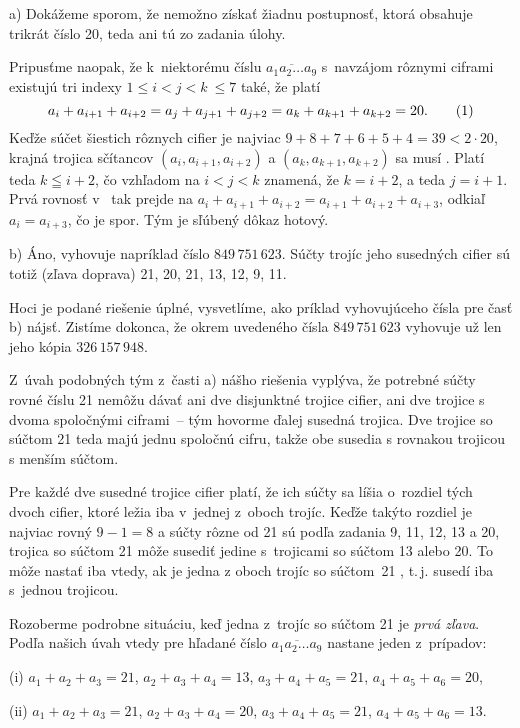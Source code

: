 {%
a) Dokážeme sporom, že nemožno získať žiadnu postupnosť,
ktorá obsahuje trikrát číslo 20, teda ani tú zo zadania úlohy.

Pripusťme naopak, že k~niektorému číslu $\overline{a_1a_2 \dots a_9}$
s~navzájom rôznymi ciframi existujú tri indexy
$1 \leq i < j < k~\leq 7$ také, že platí
$$
a_i+a_{i+1}+a_{i+2}=a_j+a_{j+1}+a_{j+2}=a_k+a_{k+1}+a_{k+2}=20.
\tag1
$$
Keďže súčet šiestich rôznych cifier je najviac
$9+8+7+6+5+4=39<2\cdot20$,
krajná trojica sčítancov
$(a_i,a_{i+1},a_{i+2})$ a $(a_k,a_{k+1},a_{k+2})$
sa musí . Platí teda $k\leqq i+2$, čo
vzhľadom na $i<j<k$ znamená, že $k=i+2$, a teda $j=i+1$.
Prvá rovnosť v~ tak prejde
na $a_i+a_{i+1}+a_{i+2}=a_{i+1}+a_{i+2}+a_{i+3}$, odkiaľ
$a_i=a_{i+3}$, čo je spor. Tým je sľúbený dôkaz hotový.

\smallskip
b) Áno, vyhovuje napríklad číslo $849\,751\,623$. Súčty trojíc jeho
susedných cifier sú totiž (zľava doprava)
21, 20, 21, 13, 12, 9, 11.

\poznamka
Hoci je podané riešenie úplné, vysvetlíme, ako
príklad vyhovujúceho čísla pre časť b) nájsť.
Zistíme dokonca, že okrem uvedeného čísla $849\,751\,623$
vyhovuje už len jeho  kópia $326\,157\,948$.

Z~úvah podobných tým z~časti a) nášho riešenia vyplýva, že potrebné
súčty rovné číslu 21 nemôžu dávať ani dve disjunktné trojice cifier,
ani dve trojice s dvoma spoločnými ciframi~-- tým hovorme
ďalej susedná trojica. Dve trojice so súčtom 21 teda majú jednu
spoločnú cifru, takže obe susedia s rovnakou trojicou s menším
súčtom.

Pre každé dve susedné trojice cifier platí, že ich súčty sa
líšia o~rozdiel tých dvoch cifier, ktoré ležia iba v~jednej z~oboch
trojíc. Keďže takýto rozdiel je najviac rovný $9-1=8$ a súčty rôzne od 21 sú podľa zadania 9, 11, 12, 13 a 20,
trojica so súčtom 21 môže susediť jedine s~trojicami so súčtom 13 alebo 20. To môže nastať iba vtedy, ak je jedna z oboch trojíc
so súčtom~21 , t.\,j. susedí iba s~jednou trojicou.

Rozoberme podrobne situáciu, keď jedna z~trojíc so súčtom 21 je
\emph{prvá zľava}. Podľa našich úvah vtedy
pre hľadané číslo $\overline{a_1a_2 \dots a_9}$ nastane jeden
z~prípadov:
\item{(i)} $a_1+a_2+a_3=21$, $a_2+a_3+a_4=13$, $a_3+a_4+a_5=21$, $a_4+a_5+a_6=20$,
\item{(ii)} $a_1+a_2+a_3=21$, $a_2+a_3+a_4=20$, $a_3+a_4+a_5=21$, $a_4+a_5+a_6=13$.

}
